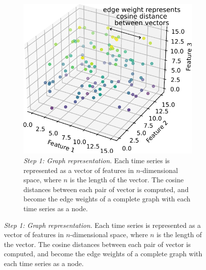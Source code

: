 \begin{figure}
  \centering
  \begin{subfigure}[t]{0.5\textwidth}
  \centering
    \includegraphics[width=\linewidth]{graph_representation}
    \caption{
      \emph{Step 1: Graph representation.}
      Each time series is represented as a vector of features in $n$-dimensional space, where $n$ is the length of the vector.
      The cosine distances between each pair of vector is computed, and become the edge weights of a complete graph with each time series as a node.
    }
    \label{fig:analysis-clustering-modclust-graph}
  \end{subfigure}


\end{figure}

